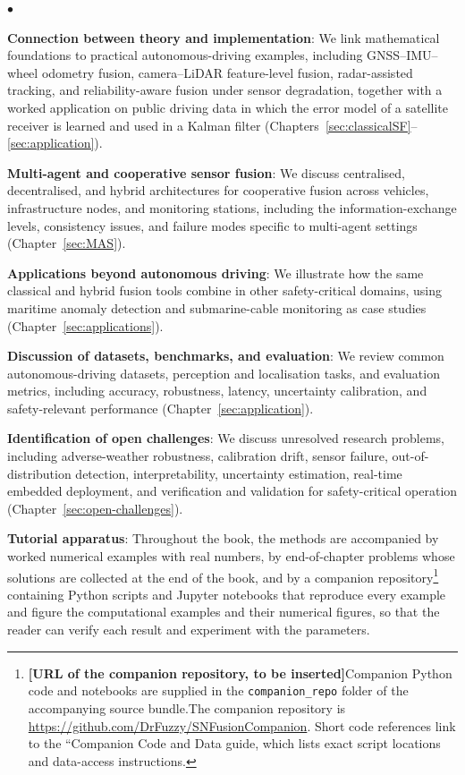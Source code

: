\documentclass[graybox,envcountchap]{style/SNmono}
\newcommand{\repopath}[1]{\texttt{#1}}
\newenvironment{list4a}{
  \begin{list}{$\bullet$}{
      \setlength{\itemsep}{0.05cm}
      \setlength{\labelsep}{0.2cm}
      \setlength{\labelwidth}{0.3cm}
      \setlength{\parsep}{0in}
      \setlength{\parskip}{0in}
      \setlength{\topsep}{0in}
      \setlength{\partopsep}{0in}
      \setlength{\leftmargin}{0.16in}}}
      {\end{list}}
\providecommand{\DIFadd}[1]{{\protect\color{blue} #1}} %
\providecommand{\DIFdel}[1]{{\protect\color{red} #1}} %
\providecommand{\DIFaddbegin}{} %
\providecommand{\DIFaddend}{} %
\providecommand{\DIFdelbegin}{} %
\providecommand{\DIFdelend}{} %
\DeclareRobustCommand{\RtwoDel}[1]{{\color{red}%
  \renewcommand{\DIFadd}[1]{##1}\renewcommand{\DIFdel}[1]{##1}%
  #1}}
\DeclareRobustCommand{\RtwoAdd}[1]{{\color{blue}#1}}
\begin{document}
\begin{list4a}
    \item \textbf{Connection between theory and implementation}: We link mathematical foundations to practical autonomous-driving examples, including GNSS--IMU--wheel odometry fusion, camera--LiDAR feature-level fusion, radar-assisted tracking, and reliability-aware fusion under sensor degradation, together with a worked application on public driving data in which the error model of a satellite receiver is learned and used in a Kalman filter (Chapters~\ref{sec:classicalSF}--\ref{sec:application}).
    \item \textbf{Multi-agent and cooperative sensor fusion}: We discuss centralised, decentralised, and hybrid architectures for cooperative fusion across vehicles, infrastructure nodes, and monitoring stations, including the information-exchange levels, consistency issues, and failure modes specific to multi-agent settings (Chapter~\ref{sec:MAS}).
    \item \textbf{Applications beyond autonomous driving}: We illustrate how the same classical and hybrid fusion tools combine in other safety-critical domains, using maritime anomaly detection and submarine-cable monitoring as case studies (Chapter~\ref{sec:applications}).
    \item \textbf{Discussion of datasets, benchmarks, and evaluation}: We review common autonomous-driving datasets, perception and localisation tasks, and evaluation metrics, including accuracy, robustness, latency, uncertainty calibration, and safety-relevant performance (Chapter~\ref{sec:application}).
    \item \textbf{Identification of open challenges}: We discuss unresolved research problems, including adverse-weather robustness, calibration drift, sensor failure, out-of-distribution detection, interpretability, uncertainty estimation, real-time embedded deployment, and verification and validation for safety-critical operation (Chapter~\ref{sec:open-challenges}).
    \item \textbf{Tutorial apparatus}: Throughout the book, the methods are accompanied by worked numerical examples with real numbers, by end-of-chapter problems whose solutions are collected at the end of the book, and by a companion repository\footnote{\RtwoDel{\DIFdel{\textbf{[URL of the companion repository, to be inserted]}}\DIFadd{Companion Python code and notebooks are supplied in the \repopath{companion\_repo} folder of the accompanying source bundle.}}\RtwoAdd{The companion repository is \url{https://github.com/DrFuzzy/SNFusionCompanion}. Short code references link to the ``Companion Code and Data guide, which lists exact script locations and data-access instructions.}} containing Python scripts and Jupyter notebooks that reproduce \DIFdelbegin \DIFdel{every example and figure}\DIFdelend \DIFaddbegin \DIFadd{the computational examples and their numerical figures}\DIFaddend , so that the reader can verify each result and experiment with the parameters.
\end{list4a}
\end{document}
